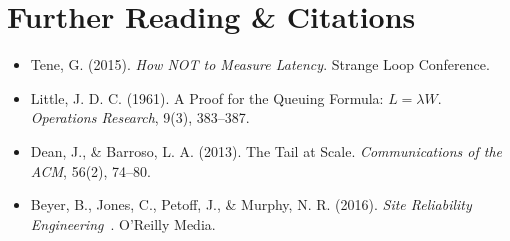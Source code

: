 \section{Further Reading \protect\& Citations}
\begin{itemize}[leftmargin=18pt]
  \item Tene, G. (2015). \textit{How NOT to Measure Latency}. Strange Loop Conference.
  \item Little, J. D. C. (1961). A Proof for the Queuing Formula: $L = \lambda W$. \textit{Operations Research}, 9(3), 383--387.
  \item Dean, J., \& Barroso, L. A. (2013). The Tail at Scale. \textit{Communications of the ACM}, 56(2), 74--80.
  \item Beyer, B., Jones, C., Petoff, J., \& Murphy, N. R. (2016). \textit{Site Reliability Engineering}~\cite{beyer2016site}. O'Reilly Media.
\end{itemize}

